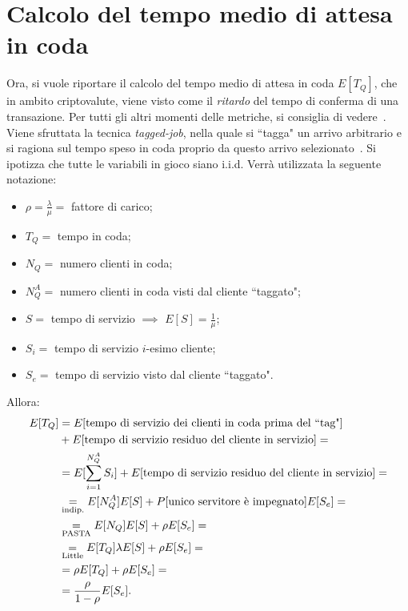\section{Calcolo del tempo medio di attesa in coda}
Ora, si vuole riportare il calcolo del tempo medio di attesa in coda $E[T_Q]$, che in ambito criptovalute, viene visto come il \textit{ritardo} del tempo di conferma di una transazione. Per tutti gli altri momenti delle metriche, si consiglia di vedere~\cite[586-587]{libro:tele}.
Viene sfruttata la tecnica \textit{tagged-job}, nella quale si ``tagga" un arrivo arbitrario e si ragiona sul tempo speso in coda proprio da questo arrivo selezionato~\cite{libro:tempo-MG1}. Si ipotizza che tutte le variabili in gioco siano i.i.d.
Verrà utilizzata la seguente notazione:
\begin{itemize}
\item $\rho=\frac{\lambda}{\mu}=$ fattore di carico;
\item $T_Q=$ tempo in coda;
\item $N_Q=$ numero clienti in coda;
\item $N_Q^A=$ numero clienti in coda visti dal cliente ``taggato";
\item $S=$ tempo di servizio $\implies$ $E[S]=\frac{1}{\mu}$;
\item $S_i=$ tempo di servizio $i$-esimo cliente;
\item $S_e=$ tempo di servizio visto dal cliente ``taggato".
\end{itemize}
Allora:
\begin{subequations}\begin{align}E[T_Q] & \notag =E[\text{tempo di servizio dei clienti in coda prima del ``tag"}]\\ \notag & +E[\text{tempo di servizio residuo del cliente in servizio}]= \\ \notag
&=E[\sum_{i=1}^{N_Q^A} S_i]+E[\text{tempo di servizio residuo del cliente in servizio}]=\\ \notag
&\underset{\text{indip.}}{=} E[N_Q^A] E[S] + P[\text{unico servitore \`e impegnato}] E[S_e]=\\ 
&\label{eq:tempo-coda} \underset{\text{PASTA}}{=} E[N_Q] E[S] + \rho E[S_e]=\\ \notag
&\underset{\text{Little}}{=} E[T_Q] \lambda E[S] + \rho E[S_e]=\\ \notag
&=\rho E[T_Q] + \rho E[S_e]=\\ 
&= \frac{\rho}{1-\rho} E[S_e]. \end{align}\end{subequations}

